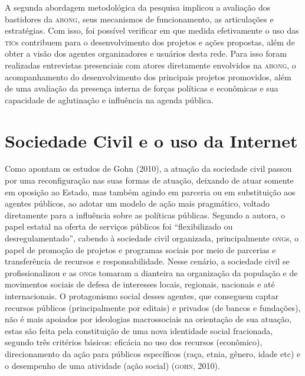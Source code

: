 A segunda abordagem metodológica da pesquisa implicou a avaliação dos
bastidores da \textsc{abong}, seus mecanismos de funcionamento, as articulações e
estratégias. Com isso, foi possível verificar em que medida efetivamente
o uso das \textsc{tic}s contribuem para o desenvolvimento dos projetos e ações
propostas, além de obter a visão dos agentes organizadores e usuários
desta rede. Para isso foram realizadas entrevistas presenciais com
atores diretamente envolvidos na \textsc{abong}, o acompanhamento do
desenvolvimento dos principais projetos promovidos, além de uma
avaliação da presença interna de forças políticas e econômicas e sua
capacidade de aglutinação e influência na agenda pública.

\section{Sociedade Civil e o uso da Internet}

Como apontam os estudos de Gohn (2010), a atuação da sociedade civil
passou por uma reconfiguração nas suas formas de atuação, deixando de
atuar somente em oposição ao Estado, mas também agindo em parceria ou em
substituição aos agentes públicos, ao adotar um modelo de ação mais
pragmático, voltado diretamente para a influência sobre as políticas
públicas. Segundo a autora, o papel estatal na oferta de serviços
públicos foi ``flexibilizado ou desregulamentado'', cabendo à sociedade
civil organizada, principalmente \textsc{ong}s, o papel de promoção de projetos e
programas sociais por meio de parcerias e transferência de recursos e
responsabilidade. Nesse cenário, a sociedade civil se profissionalizou e
as \textsc{ong}s tomaram a dianteira na organização da população e de movimentos
sociais de defesa de interesses locais, regionais, nacionais e até
internacionais. O protagonismo social desses agentes, que conseguem
captar recursos públicos (principalmente por editais) e privados (de
bancos e fundações), não é mais apoiados por ideologias macrossociais na
orientação de sua atuação, estas são feita pela constituição de uma nova
identidade social fracionada, segundo três critérios básicos: eficácia
no uso dos recursos (econômico), direcionamento da ação para públicos
específicos (raça, etnia, gênero, idade etc) e o desempenho de uma
atividade (ação social) (\textsc{gohn}, 2010).

